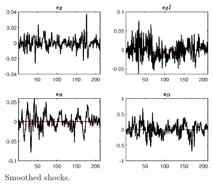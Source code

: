  
\begin{figure}[H]
\centering 
\includegraphics[width=0.80\textwidth]{BRS/graphs/BRS_SmoothedShocks1}
\caption{Smoothed shocks.}\label{Fig:SmoothedShocks:1}
\end{figure}


